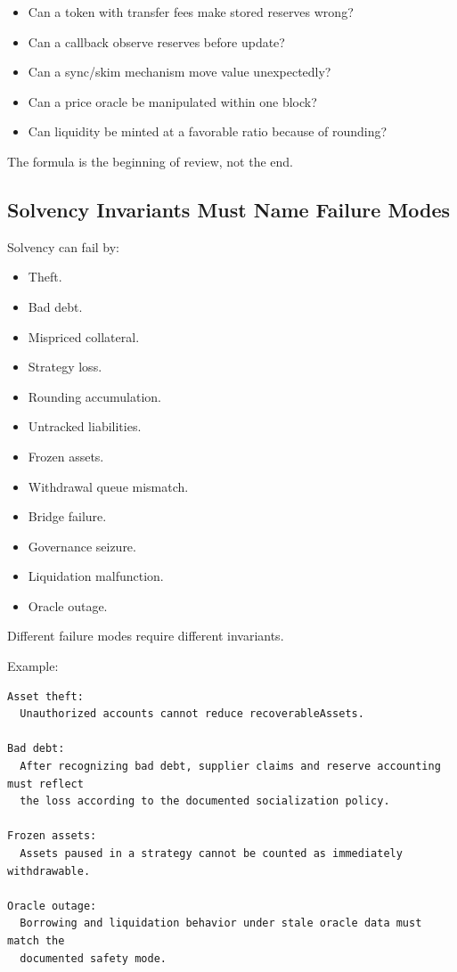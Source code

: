 \begin{itemize}
\tightlist
\item
  Can a token with transfer fees make stored reserves wrong?
\item
  Can a callback observe reserves before update?
\item
  Can a sync/skim mechanism move value unexpectedly?
\item
  Can a price oracle be manipulated within one block?
\item
  Can liquidity be minted at a favorable ratio because of rounding?
\end{itemize}

The formula is the beginning of review, not the end.

\subsection{Solvency Invariants Must Name Failure Modes}

Solvency can fail by:

\begin{itemize}
\tightlist
\item
  Theft.
\item
  Bad debt.
\item
  Mispriced collateral.
\item
  Strategy loss.
\item
  Rounding accumulation.
\item
  Untracked liabilities.
\item
  Frozen assets.
\item
  Withdrawal queue mismatch.
\item
  Bridge failure.
\item
  Governance seizure.
\item
  Liquidation malfunction.
\item
  Oracle outage.
\end{itemize}

Different failure modes require different invariants.

Example:

\begin{lstlisting}
Asset theft:
  Unauthorized accounts cannot reduce recoverableAssets.

Bad debt:
  After recognizing bad debt, supplier claims and reserve accounting must reflect
  the loss according to the documented socialization policy.

Frozen assets:
  Assets paused in a strategy cannot be counted as immediately withdrawable.

Oracle outage:
  Borrowing and liquidation behavior under stale oracle data must match the
  documented safety mode.
\end{lstlisting}

